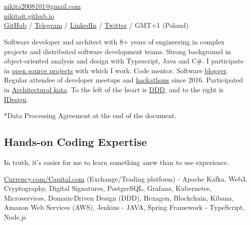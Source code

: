 \documentclass{yb}
\begin{document}
\ybPrintPhoto{}

\section*{\Large {}}

\href{mailto:nikita2008101@gmail.com}{nikita2008101@gmail.com}\\%
\href{https://nikitait.github.io/}{nikitait.github.io}\\%
\href{https://github.com/nikitait}{GitHub} /
\href{https://t.me/NonNikita}{Telegram} /
\href{https://www.linkedin.com/in/nikita-fedorov-041243126}{LinkedIn} /
\href{https://twitter.com/intent/follow?screen_name=Nikita_Fiodorov}{Twitter} / GMT+1 (Poland)
\vspace*{12pt}

Software developer and architect with
8+ years of engineering in complex projects and distributed software
development teams. Strong background in object-oriented analysis and design
with Typescript, Java and C\#. I participate in \href{https://github.com/nikitait}{open source projects} with which I work. Code mentor. Software
\href{https://nikitait.github.io}{blogger}. Regular attendee of developer meetups and \href{https://www.youtube.com/watch?v=gVKDU043EWI&t=1s&ab_channel=EPAMSaint-Petersburg}{hackathons} since 2016. Participated in \href{
https://www.youtube.com/watch?v=Qu3g_eiY4XA&ab_channel=%
}{Architectural kata}. To the left of the heart is \href{https://github.com/ddd-crew}{DDD}, and to the right is \href{https://www.idesign.net/}{IDesign}.

*Data Processing Agreement at the end of the document.

\subsection*{Hands-on Coding Expertise}

In truth, it's easier for me to learn something anew than to use experience.



\href{https://currency.com/}{Currency.com/Capital.com} (Exchange/Trading platform)
\newline - Apache Kafka, Web3, Cryptography, Digital Signatures, PostgreSQL, Grafana, Kubernetes, Microservices, Domain-Driven Design (DDD), Hexagon, Blockchain, Kibana, Amazon Web Services (AWS), Jenkins
\newline - JAVA, Spring Framework
\newline - TypeScript, Node.js
\end{document}
